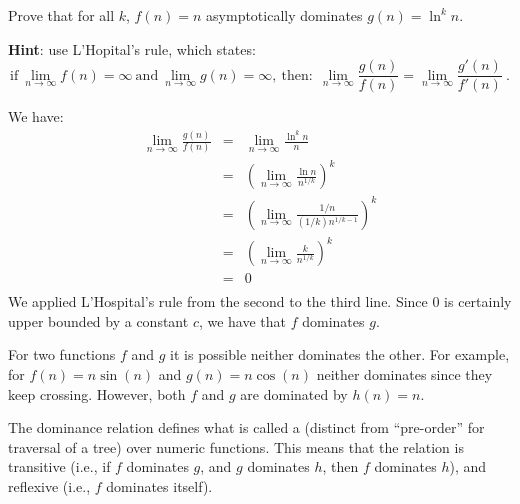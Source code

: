 \begin{flex}
\label{grp:xrcs:analysis::asymptotics::prove}

\begin{exercise}
\label{xrcs:analysis::asymptotics::prove}
Prove that for all $k$, $f(n) = n$ asymptotically dominates $g(n) =
\ln^k n$.

\textbf{Hint}: use L'Hopital's
rule, which states:
\[\mbox{if}~
\lim_{n \rightarrow \infty} f(n) = \infty~\mbox{and}~
\lim_{n \rightarrow \infty} g(n) = \infty,~\mbox{then:}~~
\lim_{n \rightarrow \infty} \frac{g(n)}{f(n)} =
\lim_{n \rightarrow \infty} \frac{g'(n)}{f'(n)}~. 
\]

\end{exercise}

\begin{solution}
\label{sol:analysis::asymptotics::applied}
We have:
\[
\begin{array}{lcl}
\displaystyle\lim_{n \rightarrow \infty} \frac{g(n)}{f(n)}
& = & \displaystyle\lim_{n \rightarrow \infty} \frac{\ln^k n}{n} \\
& = & \left( \displaystyle\lim_{n \rightarrow \infty} \frac{\ln n}{n^{1/k}}
      \right)^k\\ 
& = & \left( \displaystyle\lim_{n \rightarrow \infty} \frac{1/n}{(1/k)
      n^{1/k - 1}}
      \right)^k\\ 
& = & \left( \displaystyle\lim_{n \rightarrow \infty} \frac{k}{n^{1/k}} \right)^k\\ 
& = & 0\\
\end{array}
\]
We applied L'Hospital's rule from the second to the third line.
Since $0$ is certainly upper bounded by a constant $c$, we have that
$f$ dominates $g$.

\end{solution}
\end{flex}

\begin{cluster}
\label{grp:grm:analysis::asymptotics::functions}

\begin{gram}
\label{grm:analysis::asymptotics::functions}
For two functions $f$ and $g$ it is possible neither dominates the
other.
For example, for $f(n) = n \sin(n)$ and 
$g(n) = n \cos(n)$ neither dominates since they keep
crossing.
However, both $f$ and $g$ are dominated by $h(n) = n$. 

The dominance relation defines what is called a  (distinct
from ``pre-order'' for traversal of a tree) over numeric
functions.  This means that the relation is transitive (i.e., if $f$ dominates
$g$, and $g$ dominates $h$, then $f$ dominates $h$), and reflexive
(i.e., $f$ dominates itself).

\end{gram}
\end{cluster}

